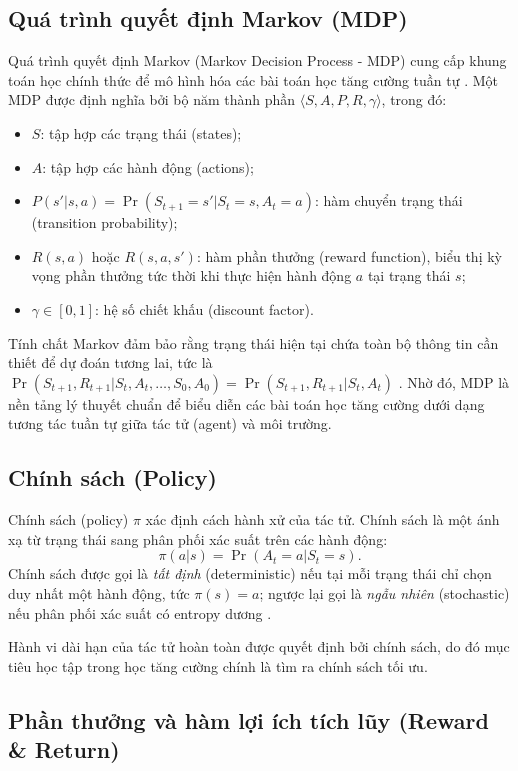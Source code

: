 \documentclass{uetgraduation}
\begin{document}
\subsection{Quá trình quyết định Markov (MDP)}

Quá trình quyết định Markov (Markov Decision Process - MDP) cung cấp khung toán học chính thức để mô hình hóa các bài toán học tăng cường tuần tự \cite{sutton2018}. Một MDP được định nghĩa bởi bộ năm thành phần $\langle S, A, P, R, \gamma \rangle$, trong đó:
\begin{itemize}
    \item $S$: tập hợp các trạng thái (states);
    \item $A$: tập hợp các hành động (actions);
    \item $P(s'|s,a) = \Pr(S_{t+1}=s'|S_t=s,A_t=a)$: hàm chuyển trạng thái (transition probability);
    \item $R(s,a)$ hoặc $R(s,a,s')$: hàm phần thưởng (reward function), biểu thị kỳ vọng phần thưởng tức thời khi thực hiện hành động $a$ tại trạng thái $s$;
    \item $\gamma \in [0,1]$: hệ số chiết khấu (discount factor).
\end{itemize}

Tính chất Markov đảm bảo rằng trạng thái hiện tại chứa toàn bộ thông tin cần thiết để dự đoán tương lai, tức là $\Pr(S_{t+1},R_{t+1}|S_t,A_t,\dots,S_0,A_0) = \Pr(S_{t+1},R_{t+1}|S_t,A_t)$ \cite{sutton2018}. Nhờ đó, MDP là nền tảng lý thuyết chuẩn để biểu diễn các bài toán học tăng cường dưới dạng tương tác tuần tự giữa tác tử (agent) và môi trường.

\subsection{Chính sách (Policy)}

Chính sách (policy) $\pi$ xác định cách hành xử của tác tử. Chính sách là một ánh xạ từ trạng thái sang phân phối xác suất trên các hành động:
\[
\pi(a|s) = \Pr(A_t = a | S_t = s).
\]
Chính sách được gọi là \textit{tất định} (deterministic) nếu tại mỗi trạng thái chỉ chọn duy nhất một hành động, tức $\pi(s) = a$; ngược lại gọi là \textit{ngẫu nhiên} (stochastic) nếu phân phối xác suất có entropy dương \cite{sutton2018}.

Hành vi dài hạn của tác tử hoàn toàn được quyết định bởi chính sách, do đó mục tiêu học tập trong học tăng cường chính là tìm ra chính sách tối ưu.

\subsection{Phần thưởng và hàm lợi ích tích lũy (Reward \& Return)}
\end{document}
